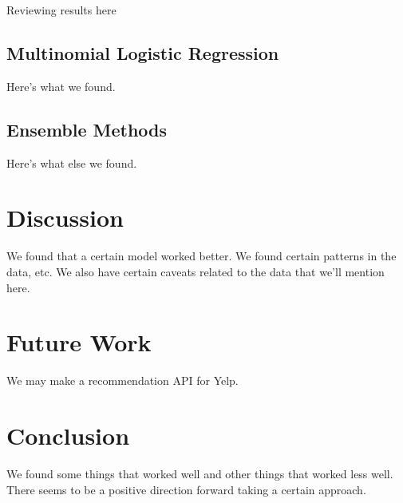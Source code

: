 \documentclass[12pt]{article}
\begin{document}
Reviewing results here

\subsection{Multinomial Logistic Regression}

Here's what we found.

\subsection{Ensemble Methods}

Here's what else we found.


\section{Discussion}

We found that a certain model worked better. We found certain patterns
in the data, etc. We also have certain caveats related to the data that
we'll mention here.

\section{Future Work}

We may make a recommendation API for Yelp.

\section{Conclusion}

We found some things that worked well and other things that worked
less well. There seems to be a positive direction forward taking a
certain approach.


 

\end{document}
